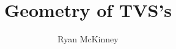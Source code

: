 \documentclass[12pt,oneside,letterpaper]{book}
\title{Geometry of TVS's}
\author{Ryan McKinney}
\begin{document}
	\newtheorem{thm}{Theorem}[section]
	\newtheorem{cor}[thm]{Corollary}
	\newtheorem{lem}[thm]{Lemma}
	\newtheorem{prop}[thm]{Proposition}
	\newtheorem{example}[thm]{Example}
	\newtheorem{rmk}[thm]{Remark}
	\newtheorem{df}[thm]{Definition}


\frontmatter
\maketitle

\tableofcontents
{}
\listoftables


\mainmatter






\backmatter

\end{document}
